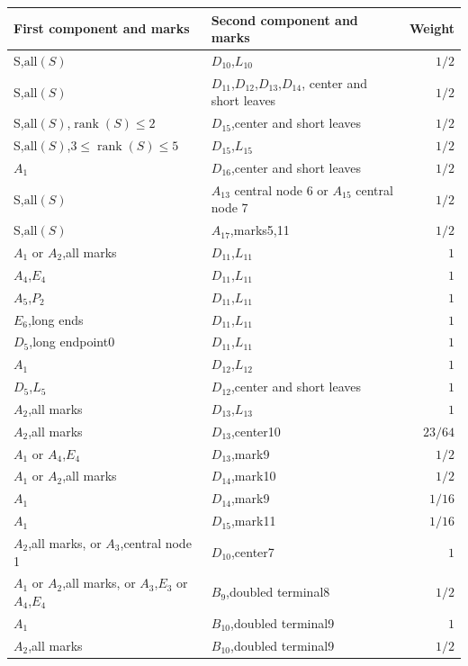 \documentclass[11pt]{article}
\theoremstyle{remark}\newtheorem{remark}[theorem]{Remark}
\begin{document}
{\small
\begin{longtable}{p{}p{}r}
\toprule First component and marks&Second component and marks&Weight\\\midrule
\endhead
 S,$\mathrm{all}(S)$ & $D_{10}$,$L_{10}$ & $1/2$ \\
 S,$\mathrm{all}(S)$ & $D_{11}$,$D_{12}$,$D_{13}$,$D_{14}$, center and short leaves & $1/2$ \\
 S,$\mathrm{all}(S)$,$\operatorname{rank}(S)\le2$ & $D_{15}$,center and short leaves & $1/2$ \\
 S,$\mathrm{all}(S)$,$3\le\operatorname{rank}(S)\le5$ & $D_{15}$,$L_{15}$ & $1/2$ \\
 $A_{1}$ & $D_{16}$,center and short leaves & $1/2$ \\
 S,$\mathrm{all}(S)$ & $A_{13}$ central node 6 or $A_{15}$ central node 7 & $1/2$ \\
 S,$\mathrm{all}(S)$ & $A_{17}$,marks5,11 & $1/2$ \\
 $A_{1}$ or $A_{2}$,all marks & $D_{11}$,$L_{11}$ & $1$ \\
 $A_{4}$,$E_{4}$ & $D_{11}$,$L_{11}$ & $1$ \\
 $A_{5}$,$P_{2}$ & $D_{11}$,$L_{11}$ & $1$ \\
 $E_{6}$,long ends & $D_{11}$,$L_{11}$ & $1$ \\
 $D_{5}$,long endpoint0 & $D_{11}$,$L_{11}$ & $1$ \\
 $A_{1}$ & $D_{12}$,$L_{12}$ & $1$ \\
 $D_{5}$,$L_{5}$ & $D_{12}$,center and short leaves & $1$ \\
 $A_{2}$,all marks & $D_{13}$,$L_{13}$ & $1$ \\
 $A_{2}$,all marks & $D_{13}$,center10 & $23/64$ \\
 $A_{1}$ or $A_{4}$,$E_{4}$ & $D_{13}$,mark9 & $1/2$ \\
 $A_{1}$ or $A_{2}$,all marks & $D_{14}$,mark10 & $1/2$ \\
 $A_{1}$ & $D_{14}$,mark9 & $1/16$ \\
 $A_{1}$ & $D_{15}$,mark11 & $1/16$ \\
 $A_{2}$,all marks, or $A_{3}$,central node 1 & $D_{10}$,center7 & $1$ \\
 $A_{1}$ or $A_{2}$,all marks, or $A_{3}$,$E_{3}$ or $A_{4}$,$E_{4}$ & $B_{9}$,doubled terminal8 & $1/2$ \\
 $A_{1}$ & $B_{10}$,doubled terminal9 & $1$ \\
 $A_{2}$,all marks & $B_{10}$,doubled terminal9 & $1/2$ \\

\end{longtable}}
\end{document}
